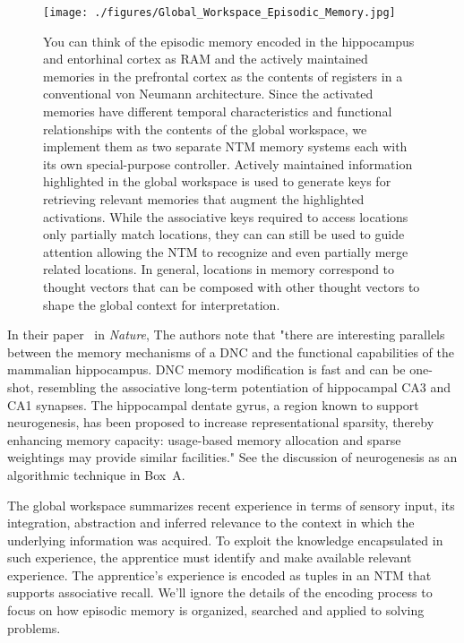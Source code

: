 \documentclass[letterpaper,11pt]{article}
\def\colorred#1{{\color{red}#1}}
\def\urlh#1{{}}
\begin{document}

\begin{figure}
%
  \begin{center} 
    \texttt{[image: ./figures/Global\_Workspace\_Episodic\_Memory.jpg]} %
  \end{center}
%
  \caption{You can think of the episodic memory encoded in the hippocampus and entorhinal cortex as RAM and the actively maintained memories in the prefrontal cortex as the contents of registers in a conventional von Neumann architecture. Since the activated memories have different temporal characteristics and functional relationships with the contents of the global workspace, we implement them as two separate NTM memory systems each with its own special-purpose controller. Actively maintained information highlighted in the global workspace is used to generate keys for retrieving relevant memories that augment the highlighted activations. While the associative keys required to access locations only partially match locations, they can can still be used to guide attention allowing the NTM to recognize and even partially merge related locations. In general, locations in memory correspond to thought vectors that can be composed with other thought vectors to shape the global context for interpretation.}
%
  \label{fig_episodic}
%
\end{figure}


In their paper~\cite{GravesetalNATURE-16} in {\it{Nature}}, The authors note that "there are interesting parallels between the memory mechanisms of a DNC and the functional capabilities of the mammalian hippocampus. DNC memory modification is fast and can be one-shot, resembling the associative long-term potentiation of hippocampal CA3 and CA1 synapses. The hippocampal dentate gyrus, a region known to support neurogenesis, has been proposed to increase representational sparsity, thereby enhancing memory capacity: usage-based memory allocation and sparse weightings may provide similar facilities." See the discussion of neurogenesis as an algorithmic technique in {\urlh{box_patterns}{Box~\colorred{A}}}.

The global workspace summarizes recent experience in terms of sensory input, its integration, abstraction and inferred relevance to the context in which the underlying information was acquired. To exploit the knowledge encapsulated in such experience, the apprentice must identify and make available relevant experience. The apprentice's experience is encoded as tuples in an NTM that supports associative recall. We'll ignore the details of the encoding process to focus on how episodic memory is organized, searched and applied to solving problems.
\end{document}
